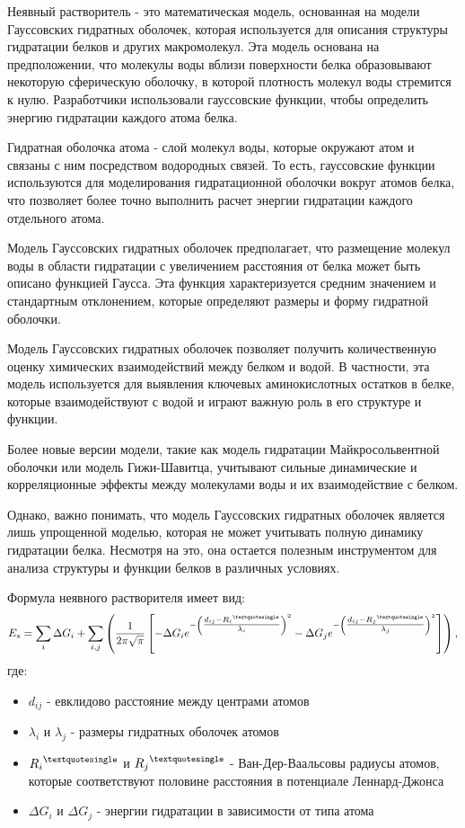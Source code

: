 Неявный растворитель - это математическая модель, основанная на модели Гауссовских гидратных оболочек, которая используется для описания структуры гидратации белков и других макромолекул. Эта модель основана на предположении, что молекулы воды вблизи поверхности белка образовывают некоторую сферическую оболочку, в которой плотность молекул воды стремится к нулю. Разработчики использовали гауссовские функции, чтобы определить энергию гидратации каждого атома белка.

Гидратная оболочка атома - слой молекул воды, которые окружают атом и связаны с ним посредством водородных связей. То есть, гауссовские функции используются для моделирования гидратационной оболочки вокруг атомов белка, что позволяет более точно выполнить расчет энергии гидратации каждого отдельного атома.

Модель Гауссовских гидратных оболочек предполагает, что размещение молекул воды в области гидратации с увеличением расстояния от белка может быть описано функцией Гаусса. Эта функция характеризуется средним значением и стандартным отклонением, которые определяют размеры и форму гидратной оболочки.

Модель Гауссовских гидратных оболочек позволяет получить количественную оценку химических взаимодействий между белком и водой. В частности, эта модель используется для выявления ключевых аминокислотных остатков в белке, которые взаимодействуют с водой и играют важную роль в его структуре и функции.

Более новые версии модели, такие как модель гидратации Майкросольвентной оболочки или модель Гижи-Шавитца, учитывают сильные динамические и корреляционные эффекты между молекулами воды и их взаимодействие с белком.

Однако, важно понимать, что модель Гауссовских гидратных оболочек является лишь упрощенной моделью, которая не может учитывать полную динамику гидратации белка. Несмотря на это, она остается полезным инструментом для анализа структуры и функции белков в различных условиях.

Формула неявного растворителя имеет вид:
\[ E_s = \sum_i \Delta G_i + \sum_{i,j} \left( \frac{1}{2 \pi \sqrt{\pi}} \left[ -\Delta G_i e^{-\left( \tfrac{d_{ij} - {R_i}^{\textquotesingle}}{\lambda_i} \right)^2} - \Delta G_j e^{-\left( \tfrac{d_{ij} - {R_j}^{\textquotesingle}}{\lambda_j} \right)^2} \right] \right), \]
где:
\begin{itemize}
	\item $d_{ij}$ - евклидово расстояние между центрами атомов
	\item $\lambda_i$ и $\lambda_j$ - размеры гидратных оболочек атомов
	\item ${R_i}^{\textquotesingle}$ и ${R_j}^{\textquotesingle}$ - Ван-Дер-Ваальсовы радиусы атомов, которые соответствуют половине расстояния в потенциале Леннард-Джонса
	\item $\Delta G_i$ и $\Delta G_j$ - энергии гидратации в зависимости от типа атома
\end{itemize}
